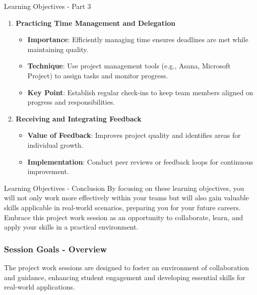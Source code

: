 \documentclass[aspectratio=169]{beamer}
\begin{document}
\begin{frame}[fragile]{Learning Objectives - Part 3}
    \begin{enumerate}[resume]
        \item \textbf{Practicing Time Management and Delegation}
        \begin{itemize}
            \item \textbf{Importance}: Efficiently managing time ensures deadlines are met while maintaining quality.
            \item \textbf{Technique}: Use project management tools (e.g., Asana, Microsoft Project) to assign tasks and monitor progress.
            \item \textbf{Key Point}: Establish regular check-ins to keep team members aligned on progress and responsibilities.
        \end{itemize}

        \item \textbf{Receiving and Integrating Feedback}
        \begin{itemize}
            \item \textbf{Value of Feedback}: Improves project quality and identifies areas for individual growth.
            \item \textbf{Implementation}: Conduct peer reviews or feedback loops for continuous improvement.
        \end{itemize}
    \end{enumerate}
\end{frame}

\begin{frame}[fragile]{Learning Objectives - Conclusion}
    By focusing on these learning objectives, you will not only work more effectively within your teams but will also gain valuable skills applicable in real-world scenarios, preparing you for your future careers. Embrace this project work session as an opportunity to collaborate, learn, and apply your skills in a practical environment.
\end{frame}

\begin{frame}[fragile]
    \frametitle{Session Goals - Overview}
    The project work sessions are designed to foster an environment of collaboration and guidance, enhancing student engagement and developing essential skills for real-world applications. 
\end{frame}
\end{document}
